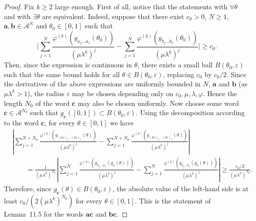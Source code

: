 \documentclass[11pt]{amsart}
\theoremstyle{plain}
\theoremstyle{definition}
\numberwithin{equation}{section}
\begin{document}
\begin{proof}
Fix $k \geq 2$ large enough. First of all, notice that the statements with $\forall \theta$ and with $\exists \theta$ are equivalent. Indeed, suppose that there exist $c_0>0$, $N \geq 1$, $\mathbf{a},\mathbf{b} \in \mathcal{A}^N$ and $\theta_0 \in [0,1]$ such that
$$ \Big|\sum_{j=1}^{N} \frac{\varphi^{(k)}(g_{a_j \dots a_1}(\theta_0))}{(\mu \lambda^k)^j} - \sum_{j=1}^{N} \frac{\varphi^{(k)}(g_{b_j \dots b_1}(\theta_0))}{(\mu \lambda^k)^j}\Big| \geq c_0. $$
Then, since the expression is continuous in $\theta$, there exists a small ball $B(\theta_0,\varepsilon)$ such that the same bound holds for all $\theta \in B(\theta_0,\varepsilon)$, replacing $c_0$ by $c_0/2$. Since the derivatives of the above expressions are uniformly bounded in $N$, $\mathbf a$ and $\mathbf b$ (as $\mu\lambda^k>1$), the radius $\varepsilon$ may be chosen depending only on $c_0,\mu,\lambda,\varphi$. Hence the length $N_0$ of the word $\mathbf c$ may also be chosen uniformly. Now choose some word $\mathbf{c} \in \mathcal{A}^{N_0}$ such that $g_\mathbf{c}([0,1]) \subset B(\theta_0,\varepsilon)$. Using the decomposition according to the word $\mathbf c$, for every $\theta\in[0,1]$ we have
\begin{align*}
&\left|\sum_{j=1}^{N+N_0}\frac{\varphi^{(k)}(g_{(ac)_j\dots(ac)_1}(\theta))}{(\mu\lambda^k)^j} - \sum_{j=1}^{N+N_0}\frac{\varphi^{(k)}(g_{(bc)_j\dots(bc)_1}(\theta))}{(\mu\lambda^k)^j}\right| \\
&\qquad = \frac{1}{(\mu\lambda^k)^{N_0}}\left|\sum_{j=1}^{N}\frac{\varphi^{(k)}(g_{a_j\dots a_1}(g_{\mathbf c}(\theta)))}{(\mu\lambda^k)^j} - \sum_{j=1}^{N}\frac{\varphi^{(k)}(g_{b_j\dots b_1}(g_{\mathbf c}(\theta)))}{(\mu\lambda^k)^j}\right| \geq \frac{c_0/2}{(\mu\lambda^k)^{N_0}}.
\end{align*}
Therefore, since $g_{\mathbf c}(\theta)\in B(\theta_0,\varepsilon)$, the absolute value of the left-hand side is at least $c_0/(2(\mu\lambda^k)^{N_0})$ for every $\theta\in[0,1]$. This is the statement of Lemma~11.5 for the words $\mathbf{ac}$ and $\mathbf{bc}$.


\end{proof}
\end{document}

